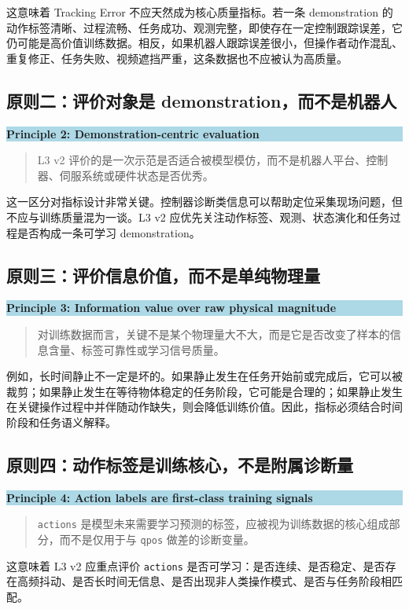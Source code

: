 \documentclass[UTF8,zihao=-4]{ctexart}
\newenvironment{principlebox}[1]{%
  \vspace{0.5em}\noindent\colorbox{LightBlue}{\parbox{0.97\linewidth}{\textbf{#1}\par\vspace{0.25em}}
  }\par\vspace{-0.8em}\noindent\begin{quote}\small
}{\end{quote}\vspace{0.4em}}
\begin{document}
这意味着 Tracking Error 不应天然成为核心质量指标。若一条 demonstration 的动作标签清晰、过程流畅、任务成功、观测完整，即使存在一定控制跟踪误差，它仍可能是高价值训练数据。相反，如果机器人跟踪误差很小，但操作者动作混乱、重复修正、任务失败、视频遮挡严重，这条数据也不应被认为高质量。

\subsection{原则二：评价对象是 demonstration，而不是机器人}

\begin{principlebox}{Principle 2: Demonstration-centric evaluation}
L3 v2 评价的是一次示范是否适合被模型模仿，而不是机器人平台、控制器、伺服系统或硬件状态是否优秀。
\end{principlebox}

这一区分对指标设计非常关键。控制器诊断类信息可以帮助定位采集现场问题，但不应与训练质量混为一谈。L3 v2 应优先关注动作标签、观测、状态演化和任务过程是否构成一条可学习 demonstration。

\subsection{原则三：评价信息价值，而不是单纯物理量}

\begin{principlebox}{Principle 3: Information value over raw physical magnitude}
对训练数据而言，关键不是某个物理量大不大，而是它是否改变了样本的信息含量、标签可靠性或学习信号质量。
\end{principlebox}

例如，长时间静止不一定是坏的。如果静止发生在任务开始前或完成后，它可以被裁剪；如果静止发生在等待物体稳定的任务阶段，它可能是合理的；如果静止发生在关键操作过程中并伴随动作缺失，则会降低训练价值。因此，指标必须结合时间阶段和任务语义解释。

\subsection{原则四：动作标签是训练核心，不是附属诊断量}

\begin{principlebox}{Principle 4: Action labels are first-class training signals}
\texttt{actions} 是模型未来需要学习预测的标签，应被视为训练数据的核心组成部分，而不是仅用于与 \texttt{qpos} 做差的诊断变量。
\end{principlebox}

这意味着 L3 v2 应重点评价 \texttt{actions} 是否可学习：是否连续、是否稳定、是否存在高频抖动、是否长时间无信息、是否出现非人类操作模式、是否与任务阶段相匹配。
\end{document}
